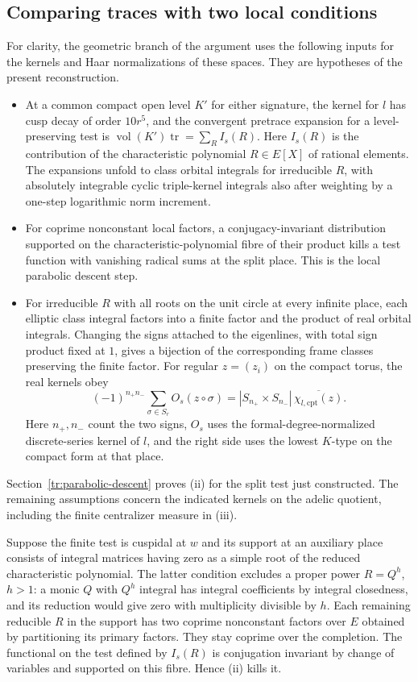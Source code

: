 \subsection{Comparing traces with two local conditions}\label{tr:geometry}
For clarity, the geometric branch of the argument uses the following
inputs for the kernels and Haar normalizations of these spaces.
They are hypotheses of the present reconstruction.
\begin{itemize}
\item[(i)] At a common compact open level $K'$ for either signature,
the kernel for $l$ has cusp decay of order $10r^5$, and the convergent
pretrace expansion for a level-preserving test is
$\operatorname{vol}(K')\operatorname{tr}=\sum_R I_s(R)$.
Here $I_s(R)$ is the contribution of the characteristic polynomial
$R\in E[X]$ of rational elements. The expansions unfold to class
orbital integrals for irreducible $R$, with absolutely integrable cyclic
triple-kernel integrals also after weighting by a one-step logarithmic
norm increment.
\item[(ii)] For coprime nonconstant local factors, a conjugacy-invariant
distribution supported on the characteristic-polynomial fibre of their
product kills a test function with vanishing radical sums at the split
place. This is the local parabolic descent step.
\item[(iii)] For irreducible $R$ with all roots on the unit circle at
every infinite place, each elliptic class integral factors into a finite
factor and the product of real orbital integrals. Changing the signs
attached to the eigenlines, with total sign product fixed at $1$, gives
a bijection of the corresponding frame classes preserving the finite factor.
For regular $z=(z_i)$ on the compact torus, the real kernels obey
\[
 (-1)^{n_+n_-}\sum_{\sigma\in S_r} O_s(z\circ\sigma)
 =|S_{n_+}\times S_{n_-}|\,\overline{\chi_{l,\mathrm{cpt}}(z)}.
\]
Here $n_+,n_-$ count the two signs, $O_s$ uses the
formal-degree-normalized discrete-series kernel of $l$, and the right side
uses the lowest $K$-type on the compact form at that place.
\end{itemize}
Section~\ref{tr:parabolic-descent} proves (ii) for the split test just constructed. The remaining assumptions concern the indicated kernels on the adelic quotient,
including the finite centralizer measure in (iii).

Suppose the finite test is cuspidal at $w$ and its support at an auxiliary
place consists of integral matrices having zero as a simple root of the
reduced characteristic polynomial. The latter condition excludes a proper
power $R=Q^h$, $h>1$: a monic $Q$ with $Q^h$ integral has integral
coefficients by integral closedness, and its reduction would give zero
with multiplicity divisible by $h$. Each remaining reducible $R$ in the
support has two coprime nonconstant factors over $E$ obtained by
partitioning its primary factors. They stay coprime over the completion.
The functional on the test defined by $I_s(R)$ is conjugation invariant
by change of variables and supported on this fibre. Hence (ii) kills it.

